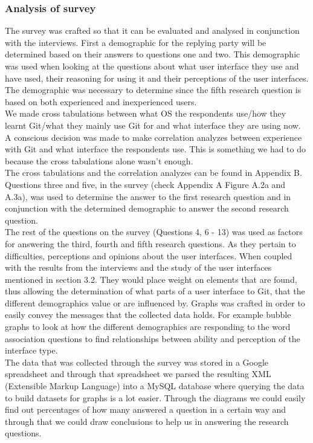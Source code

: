 \documentclass[a4paper,oneside]{bth} %
\begin{document}
					\subsubsection*{Analysis of survey}
					The survey was crafted so that it can be evaluated and analysed in conjunction with the interviews. 
					First a demographic for the replying party will be determined based on their answers to questions one and two. This demographic was used when looking at the questions about what user interface they use and have used, their reasoning for using it and their perceptions of the user interfaces. The demographic was necessary to determine since the fifth research question is based on both experienced and inexperienced users.\\
					We made cross tabulations between what OS the respondents use/how they learnt Git/what they mainly use Git for and what interface they are using now. A conscious decision was made to make correlation analyzes between experience with Git and what interface the respondents use. This is something we had to do because the cross tabulations alone wasn't enough.\\
					The cross tabulations and the correlation analyzes can be found in Appendix B.
					\\
					Questions three and five, in the survey (check Appendix A Figure A.2a and A.3a), was used to determine the answer to the first research question and in conjunction with the determined demographic to answer the second research question.
					\\
					The rest of the questions on the survey (Questions 4, 6 - 13) was used as factors for answering the third, fourth and fifth research questions. As they pertain to difficulties, perceptions and opinions about the user interfaces. When coupled with the results from the interviews and the study of the user interfaces mentioned in section 3.2. They would place weight on elements that are found, thus allowing the determination of what parts of a user interface to Git, that the different demographics value or are influenced by. Graphs was crafted in order to easily convey the messages that the collected data holds. For example bubble graphs to look at how the different demographics are responding to the word association questions to find relationships between ability and perception of the interface type. 
					\\
					The data that was collected through the survey was stored in a Google spreadsheet \cite{GoogleSpreadsheet} and through that spreadsheet we parsed the resulting XML (Extensible Markup Language) into a MySQL database where querying the data to build datasets for graphs is a lot easier.
					Through the diagrams we could easily find out percentages of how many answered a question in a certain way and through that we could draw conclusions to help us in answering the research questions.
					
\end{document}
